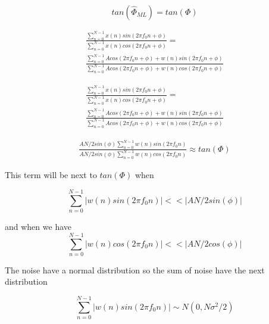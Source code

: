 \documentclass{report}
\begin{document}
\begin{equation}\label{key}
tan(\hat{\Phi}_{ML} )= tan(\Phi)
\end{equation}



\begin{gather*}
\frac{\sum_{n=0}^{N-1}x(n)sin(2\pi f_0n+\phi)}{\sum_{n=0}^{N-1}x(n)cos(2\pi f_0n+\phi)} = \\
\frac{\sum_{n=0}^{N-1}Acos(2\pi f_0n+\phi)+w(n)sin(2\pi f_0n+\phi)}{\sum_{n=0}^{N-1}Acos(2\pi f_0n+\phi)+w(n)cos(2\pi f_0n+\phi)}
\end{gather*}


\begin{gather*}
\frac{\sum_{n=0}^{N-1}x(n)sin(2\pi f_0n+\phi)}{\sum_{n=0}^{N-1}x(n)cos(2\pi f_0n+\phi)} = \\
\frac{\sum_{n=0}^{N-1}Acos(2\pi f_0n+\phi)+w(n)sin(2\pi f_0n+\phi)}{\sum_{n=0}^{N-1}Acos(2\pi f_0n+\phi)+w(n)cos(2\pi f_0n+\phi)}
\end{gather*}



\begin{gather*}
\frac{AN/2 sin(\phi)\sum_{n=0}^{N-1}w(n)sin(2\pi f_0n)}{AN/2 sin(\phi)\sum_{n=0}^{N-1}w(n)cos(2\pi f_0n)} \approx tan(\Phi)
\end{gather*}

This term will be next to $tan(\Phi)$ when 

\begin{equation}\label{key}
\sum_{n=0}^{N-1}|w(n)sin(2\pi f_0n)|<<|AN/2 sin(\phi)|
\end{equation}

and when we have 
\begin{equation}\label{key}
\sum_{n=0}^{N-1}|w(n)cos(2\pi f_0n)|<<|AN/2 cos(\phi)|
\end{equation}

The noise have a normal distribution so the sum of noise have the next distribution

\begin{equation}\label{key}
\sum_{n=0}^{N-1}|w(n)sin(2\pi f_0n)|\sim \textit{N}(0,N\sigma^2/2)
\end{equation}
\end{document}
